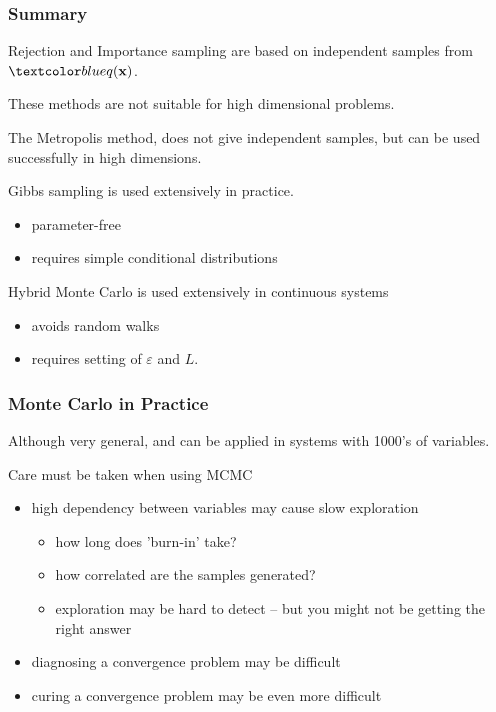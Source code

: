 \begin{frame}
\frametitle{Summary}

Rejection and Importance sampling are based on independent samples from
$\Blue{q(\bfx)}$.

These methods are not suitable for high dimensional problems.

The Metropolis method, does not give independent samples, but can be used
successfully in high dimensions.

Gibbs sampling is used extensively in practice.
\begin{itemize}
\item parameter-free
\item requires simple conditional distributions
\end{itemize}

Hybrid Monte Carlo is used extensively in continuous systems
\begin{itemize}
\item avoids random walks
\item requires setting of $\varepsilon$ and $L$.
\end{itemize}
\end{frame}

\begin{frame}
\frametitle{Monte Carlo in Practice}

Although very general, and can be applied in systems with 1000's of
variables.

Care must be taken when using MCMC
\begin{itemize}
\item high dependency between variables may cause slow exploration
\begin{itemize}
\item how long does 'burn-in' take?
\item how correlated are the samples generated?
\item {} exploration may be hard to detect -- but you might
  not be getting the right answer
\end{itemize}
\item diagnosing a convergence problem may be difficult
\item curing a convergence problem may be even more difficult
\end{itemize}
\end{frame}

